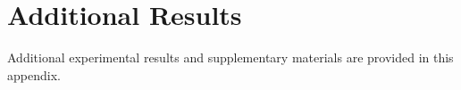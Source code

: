 \documentclass[14pt, a4paper]{report}
\begin{document}




\tableofcontents
\listoffigures
\listoftables







\printbibliography

\appendix
\chapter{Additional Results}
\label{chap:appendix}

Additional experimental results and supplementary materials are provided in this appendix.
\end{document}
